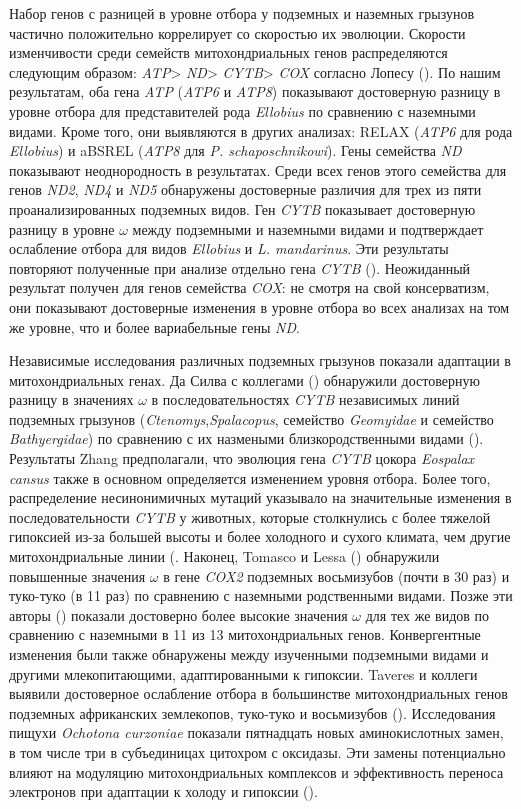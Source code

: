 Набор генов с разницей в уровне отбора у подземных и наземных грызунов частично положительно коррелирует со скоростью их эволюции. Скорости изменчивости среди семейств митохондриальных генов распределяются следующим образом: \textit{ATP}> \textit{ND}> \textit{CYTB}> \textit{COX} согласно Лопесу (\cite{Lopez1997}). По нашим результатам, оба гена \textit{ATP} (\textit{ATP6} и \textit{ATP8}) показывают достоверную разницу в уровне отбора для представителей рода \textit{Ellobius} по сравнению с наземными видами. Кроме того, они выявляются в других анализах: RELAX (\textit{ATP6} для рода \textit{Ellobius}) и aBSREL (\textit{ATP8} для \textit{P. schaposchnikowi}). Гены семейства \textit{ND} показывают неоднородность в результатах. Среди всех генов этого семейства для генов \textit{ND2}, \textit{ND4} и \textit{ND5} обнаружены достоверные различия для трех из пяти проанализированных подземных видов. Ген \textit{CYTB} показывает достоверную разницу в уровне $\omega$ между подземными и наземными видами и подтверждает ослабление отбора для видов \textit{Ellobius} и \textit{L. mandarinus}. Эти результаты повторяют полученные при анализе отдельно гена \textit{CYTB} (\cite{Bondareva2021}). Неожиданный результат получен для генов семейства \textit{COX}: не смотря на свой консерватизм, они показывают достоверные изменения в уровне отбора во всех анализах на том же уровне, что и более вариабельные гены \textit{ND}.


Независимые исследования различных подземных грызунов показали адаптации в митохондриальных генах. Да Силва с коллегами (\cite{DaSilva2009}) обнаружили достоверную разницу в значениях $\omega$ в последовательностях \textit{CYTB} независимых линий подземных грызунов (\textit{Ctenomys},\textit{Spalacopus}, семейство \textit{Geomyidae} и семейство \textit{Bathyergidae}) по сравнению с их назмеными близкородственными видами (\cite{Tomasco2014}). Результаты Zhang предполагали, что эволюция гена \textit{CYTB} цокора \textit{Eospalax cansus} также в основном определяется изменением уровня отбора. Более того, распределение несинонимичных мутаций указывало на значительные изменения в последовательности \textit{CYTB} у животных, которые столкнулись с более тяжелой гипоксией из-за большей высоты и более холодного и сухого климата, чем другие митохондриальные линии (\cite{Zhang2013a}. Наконец, Tomasco и Lessa (\cite{Tomasco2011}) обнаружили повышенные значения $\omega$ в гене \textit{COX2} подземных восьмизубов (почти в 30 раз) и туко-туко (в 11 раз) по сравнению с наземными родственными видами. Позже эти авторы (\cite{Tomasco2011}) показали достоверно более высокие значения $\omega$ для тех же видов по сравнению с наземными в 11 из 13 митохондриальных генов. Конвергентные изменения были также обнаружены между изученными подземными видами и другими млекопитающими, адаптированными к гипоксии. Taveres и коллеги выявили достоверное ослабление отбора в большинстве митохондриальных генов подземных африканских землекопов, туко-туко и восьмизубов (\cite{Tavares2018}). Исследования пищухи \textit{Ochotona curzoniae} показали пятнадцать новых аминокислотных замен, в том числе три в субъединицах цитохром с оксидазы. Эти замены потенциально влияют на модуляцию митохондриальных комплексов и эффективность переноса электронов при адаптации к холоду и гипоксии (\cite{Luo2008}).

